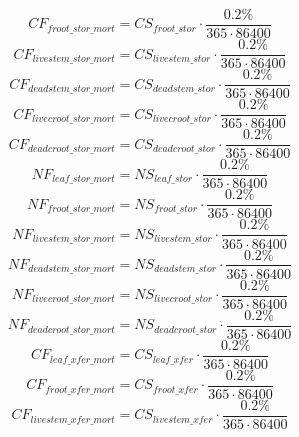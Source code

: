 \begin{equation}
  CF_{froot\_{{stor}\_{mort}}}=CS_{froot\_{stor}}\cdot \frac{0.2\%}{365\cdot 86400}
\end{equation}
\begin{equation}
CF_{livestem\_{{stor}\_{mort}}}=CS_{livestem\_{stor}}\cdot \frac{0.2\%}{365\cdot 86400}
\end{equation}
\begin{equation}
  CF_{deadstem\_{{stor}\_{mort}}}=CS_{deadstem\_{stor}}\cdot \frac{0.2\%}{365\cdot 86400}
\end{equation}
\begin{equation}
  CF_{livecroot\_{{stor}\_{mort}}}=CS_{livecroot\_{stor}}\cdot \frac{0.2\%}{365\cdot 86400}
\end{equation}
\begin{equation}
  CF_{deadcroot\_{{stor}\_{mort}}}=CS_{deadcroot\_{stor}}\cdot \frac{0.2\%}{365\cdot 86400}
\end{equation}
\begin{equation}
  NF_{leaf\_{{stor}\_{mort}}}=NS_{leaf\_{stor}}\cdot \frac{0.2\%}{365\cdot 86400}
\end{equation}
\begin{equation}
  NF_{froot\_{{stor}\_{mort}}}=NS_{froot\_{stor}}\cdot \frac{0.2\%}{365\cdot 86400}
\end{equation}
\begin{equation}
  NF_{livestem\_{{stor}\_{mort}}}=NS_{livestem\_{stor}}\cdot \frac{0.2\%}{365\cdot 86400}
\end{equation}
\begin{equation}
  NF_{deadstem\_{{stor}\_{mort}}}=NS_{deadstem\_{stor}}\cdot \frac{0.2\%}{365\cdot 86400}
\end{equation}
\begin{equation}
  NF_{livecroot\_{{stor}\_{mort}}}=NS_{livecroot\_{stor}}\cdot \frac{0.2\%}{365\cdot 86400}
\end{equation}
\begin{equation}
  NF_{deadcroot\_{{stor}\_{mort}}}=NS_{deadcroot\_{stor}}\cdot \frac{0.2\%}{365\cdot 86400}
\end{equation}
\begin{equation}
  CF_{leaf\_{{xfer}\_{mort}}}=CS_{leaf\_{xfer}}\cdot \frac{0.2\%}{365\cdot 86400}
\end{equation}
\begin{equation}
  CF_{froot\_{{xfer}\_{mort}}}=CS_{froot\_{xfer}}\cdot \frac{0.2\%}{365\cdot 86400}
\end{equation}
\begin{equation}
  CF_{livestem\_{{xfer}\_{mort}}}=CS_{livestem\_{xfer}}\cdot \frac{0.2\%}{365\cdot 86400}
\end{equation}
